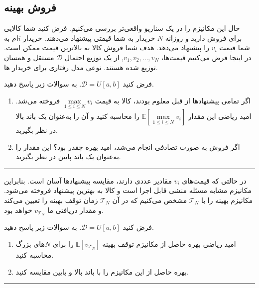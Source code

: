 \documentclass[a4paper]{article}
\begin{document}
\subsection{فروش بهینه}

حال این مکانیزم را در یک سناریو واقعی‌تر بررسی می‌کنیم.
فرض کنید شما کالایی برای فروش دارید و روزانه $N$ خریدار به شما قیمتی پیشنهاد می‌دهند. خریدار $i$ام به شما قیمت $v_i$ را پیشنهاد می‌دهد. هدف شما فروش کالا به بالاترین قیمت ممکن است. در اینجا فرض می‌کنیم قیمت‌ها، $v_1, v_2, \dots, v_N$, از یک توزیع احتمال $\mathcal{D}$ مستقل و همسان توزیع شده هستند. نوعی مدل رفتاری برای خریدار ها.

\vspace{5mm}{\color{ThQColor}\hrule}
\begin{ThQuestion}
	فرض کنید $\mathcal{D}=U[a,b]$. به سوالات زیر پاسخ دهید.

	\begin{enumerate}
		\item اگر تمامی پیشنهادها از قبل معلوم بودند، کالا به قیمت $\max\limits_{1\leq i\leq N} v_i$ فروخته می‌شد. امید ریاضی این مقدار $\mathbb{E}[\max\limits_{1\leq i\leq N} v_i]$ را محاسبه کنید و آن را به‌عنوان یک باند بالا در نظر بگیرید.
		\item اگر فروش به صورت تصادفی انجام می‌شد، امید بهره چقدر بود؟ این مقدار را به‌عنوان یک باند پایین در نظر بگیرید.
	\end{enumerate}
\end{ThQuestion}
{\color{ThQColor}\hrule}\vspace{5mm}

در حالتی که قیمت‌های $v_i$ مقادیر عددی دارند، مقایسه پیشنهادها آسان است. بنابراین مکانیزم مشابه مسئله منشی قابل اجرا است و کالا به بهترین پیشنهاد فروخته می‌شود. مکانیزم بهینه را با $\mathcal{T}_N$ مشخص می‌کنیم که در آن $\mathcal{T}_N$ زمان توقف بهینه را تعیین می‌کند و مقدار دریافتی ما $v_{\mathcal{T}_N}$ خواهد بود.

\vspace{5mm}{\color{ThQColor}\hrule}
\begin{ThQuestion}
	فرض کنید $\mathcal{D}=U[a,b]$. به سوالات زیر پاسخ دهید.

	\begin{enumerate}
		\item امید ریاضی بهره حاصل از مکانیزم توقف بهینه $\mathbb{E}[v_{\mathcal{T}_N}]$ را برای $N$های بزرگ محاسبه کنید.
		\item بهره حاصل از این مکانیزم را با باند بالا و پایین مقایسه کنید.
	\end{enumerate}
\end{ThQuestion}
{\color{ThQColor}\hrule}\vspace{5mm}
\end{document}
